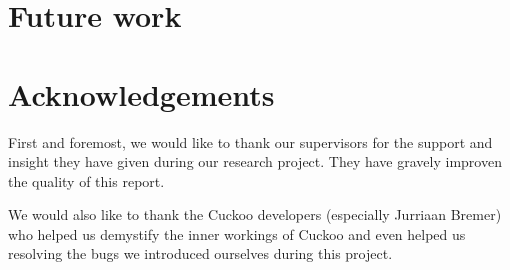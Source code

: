 \documentclass{scrartcl}
\begin{document}
\clearpage

\section{Future work}


\clearpage

\section{Acknowledgements}

First and foremost, we would like to thank our supervisors for the support and insight they have given during our research project. They have gravely improven the quality of this report.

We would also like to thank the Cuckoo developers (especially Jurriaan Bremer) who helped us demystify the inner workings of Cuckoo and even helped us resolving the bugs we introduced ourselves during this project.

\clearpage




\end{document}
